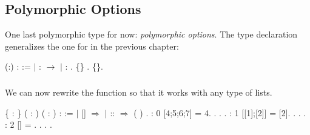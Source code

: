 \documentclass[12pt]{report}
\begin{document}
\subsection{Polymorphic Options}



 One last polymorphic type for now: \textit{polymorphic options}.
    The type declaration generalizes the one for  in the
    previous chapter: \begin{coqdoccode}
\coqdocemptyline
\coqdocnoindent
{}  (:) :  :=\coqdoceol
\coqdocindent{1.00em}
\ensuremath{|}  :  \ensuremath{\rightarrow}  \coqdoceol
\coqdocindent{1.00em}
\ensuremath{|}  :  .\coqdoceol
\coqdocemptyline
\coqdocnoindent
{}  \{\} \coqdocvar{\_}.\coqdoceol
\coqdocnoindent
{}  \{\}.\coqdoceol
\coqdocemptyline
\end{coqdoccode}
\subsubsection{ }

 We can now rewrite the  function so that it works
    with any type of lists. \begin{coqdoccode}
\coqdocemptyline
\coqdocnoindent
{}  \{ : \} ( : )\coqdoceol
\coqdocindent{7.50em}
( :  ) :   :=\coqdoceol
\coqdocindent{1.00em}
  \coqdoceol
\coqdocindent{1.00em}
\ensuremath{|} [] \ensuremath{\Rightarrow} \coqdoceol
\coqdocindent{1.00em}
\ensuremath{|}  ::  \ensuremath{\Rightarrow}          ( ) \coqdoceol
\coqdocindent{1.00em}
.\coqdoceol
\coqdocemptyline
\coqdocnoindent
{}  :     0 [4;5;6;7]  =  4.\coqdoceol
\coqdocnoindent
{}. . .\coqdoceol
\coqdocnoindent
{}  :      1 [[1];[2]]  =  [2].\coqdoceol
\coqdocnoindent
{}. . .\coqdoceol
\coqdocnoindent
{}  :      2 []  = .\coqdoceol
\coqdocnoindent
{}. . .\coqdoceol
\coqdocemptyline
\end{coqdoccode}
\end{document}
